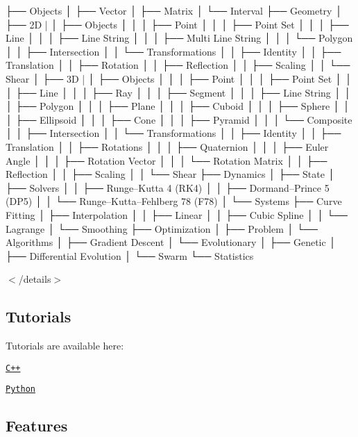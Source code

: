 \begin{DoxyCode}
├── Objects
│   ├── Vector
│   ├── Matrix
│   └── Interval
├── Geometry
│   ├── 2D
|   │   ├── Objects
│   │   │   ├── Point
│   │   │   ├── Point Set
│   │   │   ├── Line
│   │   │   ├── Line String
│   │   │   ├── Multi Line String
│   │   │   └── Polygon
│   │   ├── Intersection
│   │   └── Transformations
│   │       ├── Identity
│   │       ├── Translation
│   │       ├── Rotation
│   │       ├── Reflection
│   │       ├── Scaling
│   │       └── Shear
│   ├── 3D
|   │   ├── Objects
│   │   │   ├── Point
│   │   │   ├── Point Set
│   │   │   ├── Line
│   │   │   ├── Ray
│   │   │   ├── Segment
│   │   │   ├── Line String
│   │   │   ├── Polygon
│   │   │   ├── Plane
│   │   │   ├── Cuboid
│   │   │   ├── Sphere
│   │   │   ├── Ellipsoid
│   │   │   ├── Cone
│   │   │   ├── Pyramid
│   │   │   └── Composite
│   │   ├── Intersection
│   │   └── Transformations
│   │       ├── Identity
│   │       ├── Translation
│   │       ├── Rotations
│   │       │   ├── Quaternion
│   │       │   ├── Euler Angle
│   │       │   ├── Rotation Vector
│   │       │   └── Rotation Matrix
│   │       ├── Reflection
│   │       ├── Scaling
│   │       └── Shear
├── Dynamics
│   ├── State
│   ├── Solvers
│   │   ├── Runge–Kutta 4 (RK4)
│   │   ├── Dormand–Prince 5 (DP5)
│   │   └── Runge–Kutta–Fehlberg 78 (F78)
│   └── Systems
├── Curve Fitting
│   ├── Interpolation
│   │   ├── Linear
│   │   ├── Cubic Spline
│   │   └── Lagrange
│   └── Smoothing
├── Optimization
│   ├── Problem
│   └── Algorithms
│       ├── Gradient Descent
│       └── Evolutionary
│           ├── Genetic
│           ├── Differential Evolution
│           └── Swarm
└── Statistics
\end{DoxyCode}


$<$/details$>$

\subsection*{Tutorials}

Tutorials are available here\+:


\begin{DoxyItemize}
\item \href{./tutorials/cpp}{\tt C++}
\item \href{./tutorials/python}{\tt Python}
\end{DoxyItemize}

\subsection*{Features}

